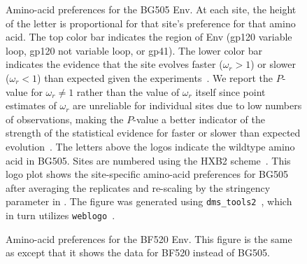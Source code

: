 \documentclass[9pt]{elife}
\begin{document}
\begin{figure}
\begin{fullwidth}
\caption{\label{fig:BG505prefs}
Amino-acid preferences for the BG505 Env.
At each site, the height of the letter is proportional for that site's preference for that amino acid.
The top color bar indicates the region of Env (gp120 variable loop, gp120 not variable loop, or gp41).
The lower color bar indicates the evidence that the site evolves faster ($\omega_r > 1$) or slower ($\omega_r < 1$) than expected given the experiments~\citep[see the last section of the Results and][]{bloom2017identification}.
We report the $P$-value for $\omega_r \ne 1$ rather than the value of $\omega_r$ itself since point estimates of $\omega_r$ are unreliable for individual sites due to low numbers of observations, making the $P$-value a better indicator of the strength of the statistical evidence for faster or slower than expected evolution~\citep{kosakovsky2005not,murrell2012detecting}.
The letters above the logos indicate the wildtype amino acid in BG505.
Sites are numbered using the HXB2 scheme~\citep{korber1998numbering}.
This logo plot shows the site-specific amino-acid preferences for BG505 after averaging the replicates and re-scaling by the stringency parameter in .
The figure was generated using \texttt{dms\_tools2}~\citep[\url{https://jbloomlab.github.io/dms_tools2/}]{bloom2015software}, which in turn utilizes \texttt{weblogo}~\citep{crooks2004weblogo}.
}
\end{fullwidth}
\end{figure}

\begin{figure}
\begin{fullwidth}
\caption{\label{fig:BF520prefs}
Amino-acid preferences for the BF520 Env.
This figure is the same as  except that it shows the data for BF520 instead of BG505.
}
\end{fullwidth}
\end{figure}
\end{document}
